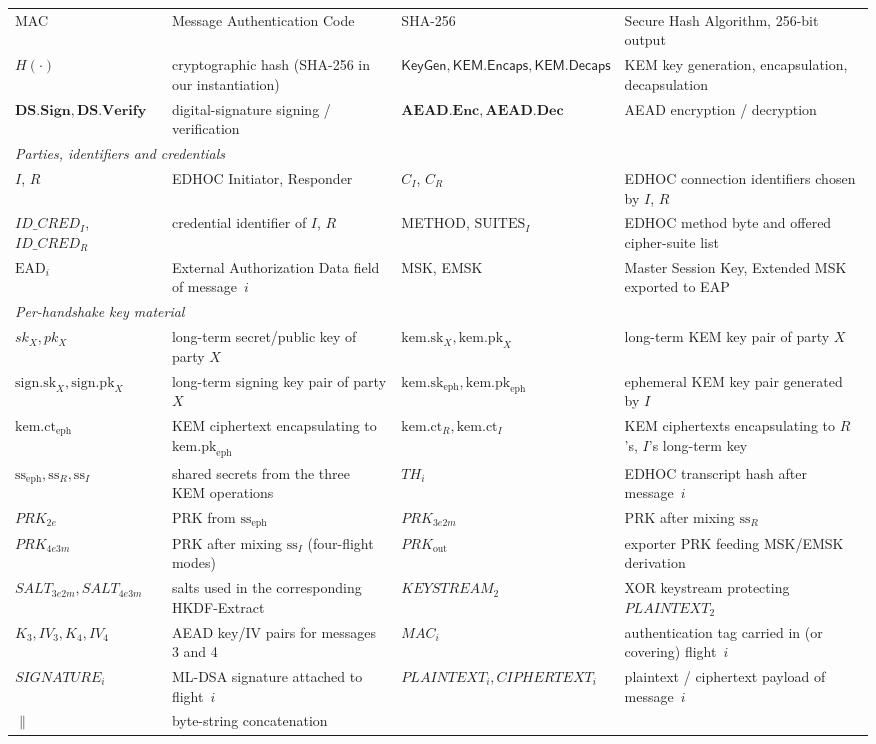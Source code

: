 \documentclass{easychair}
\newcommand{\KemKeyGen}{\mathsf{KeyGen}}
\newcommand{\Encaps}{\mathsf{KEM.Encaps}}
\newcommand{\Decaps}{\mathsf{KEM.Decaps}}
\begin{document}
\begin{table}[h]
\begin{tabularx}{\linewidth}{@{}l X l X@{}}
MAC    & Message Authentication Code & SHA-256 & Secure Hash Algorithm, 256-bit output \\
$H(\cdot)$ & cryptographic hash (SHA-256 in our instantiation) & $\KemKeyGen,\Encaps,\Decaps$ & KEM key generation, encapsulation, decapsulation \\
$\mathbf{DS.Sign},\mathbf{DS.Verify}$ & digital-signature signing / verification & $\mathbf{AEAD.Enc},\mathbf{AEAD.Dec}$ & AEAD encryption / decryption \\
\midrule
\multicolumn{4}{l}{\textit{Parties, identifiers and credentials}} \\
$I$, $R$ & EDHOC Initiator, Responder & $C_I$, $C_R$ & EDHOC connection identifiers chosen by $I$, $R$ \\
$ID\_CRED_I$, $ID\_CRED_R$ & credential identifier of $I$, $R$ & METHOD, $\mathrm{SUITES}_I$ & EDHOC method byte and offered cipher-suite list \\
$\mathrm{EAD}_i$ & External Authorization Data field of message~$i$ & MSK, EMSK & Master Session Key, Extended MSK exported to EAP \\
\midrule
\multicolumn{4}{l}{\textit{Per-handshake key material}} \\
$sk_X, pk_X$ & long-term secret/public key of party $X$ & $\mathrm{kem.sk}_X, \mathrm{kem.pk}_X$ & long-term KEM key pair of party $X$ \\
$\mathrm{sign.sk}_X, \mathrm{sign.pk}_X$ & long-term signing key pair of party $X$ & $\mathrm{kem.sk}_{\mathrm{eph}}, \mathrm{kem.pk}_{\mathrm{eph}}$ & ephemeral KEM key pair generated by $I$ \\
$\mathrm{kem.ct}_{\mathrm{eph}}$ & KEM ciphertext encapsulating to $\mathrm{kem.pk}_{\mathrm{eph}}$ & $\mathrm{kem.ct}_R, \mathrm{kem.ct}_I$ & KEM ciphertexts encapsulating to $R$'s, $I$'s long-term key \\
$\mathrm{ss}_{\mathrm{eph}}, \mathrm{ss}_R, \mathrm{ss}_I$ & shared secrets from the three KEM operations & $TH_i$ & EDHOC transcript hash after message~$i$ \\
$PRK_{2e}$ & PRK from $\mathrm{ss}_{\mathrm{eph}}$ & $PRK_{3e2m}$ & PRK after mixing $\mathrm{ss}_R$ \\
$PRK_{4e3m}$ & PRK after mixing $\mathrm{ss}_I$ (four-flight modes) & $PRK_{\mathrm{out}}$ & exporter PRK feeding MSK/EMSK derivation \\
$SALT_{3e2m}, SALT_{4e3m}$ & salts used in the corresponding HKDF-Extract & $KEYSTREAM_2$ & XOR keystream protecting $PLAINTEXT_2$ \\
$K_3,IV_3,K_4,IV_4$ & AEAD key/IV pairs for messages 3 and 4 & $MAC_i$ & authentication tag carried in (or covering) flight~$i$ \\
$SIGNATURE_i$ & ML-DSA signature attached to flight~$i$ & $PLAINTEXT_i, CIPHERTEXT_i$ & plaintext / ciphertext payload of message~$i$ \\
$\parallel$ & byte-string concatenation & & \\
\bottomrule
\end{tabularx}
\end{table}
\end{document}
